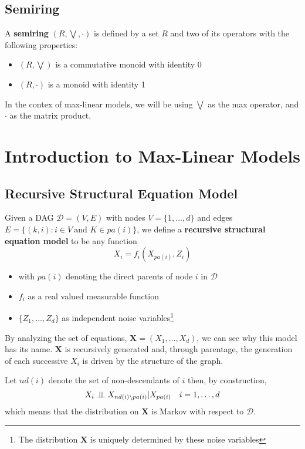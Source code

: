 \documentclass[12pt]{article}
\newcommand{\indep}{\perp \hspace{-.5 em} \perp}
\def\x{\mathbf{X}}
\newcommand{\ds}{\displaystyle}
\theoremstyle{definition}
\theoremstyle{definition}
\begin{document}
\subsection{Semiring}
A \textbf{semiring} $(R,\bigvee,\cdot)$ is defined by a set $R$ and two of its operators with the following properties:
\begin{itemize}
    \item $(R,\bigvee) $ is a commutative monoid with identity 0
    \item $(R,\cdot)$ is a monoid with identity 1
\end{itemize}
In the contex of max-linear models, we will be using $\bigvee$ as the max operator, and $\cdot$ as the matrix product.

\section{Introduction to Max-Linear Models}
\subsection{Recursive Structural Equation Model}
Given a DAG $\mathcal{D}=(V,E)$ with nodes $V=\{1,\hdots, d\}$ and edges $E=\{(k,i):i \in V \ \text{and } K \in pa(i)\}$, we define a \textbf{recursive structural equation model} to be any function $$X_i=f_i(X_{pa(i)},Z_i)$$

\begin{itemize}
    \item with $ \ds pa(i)$ denoting the direct parents of node $i$ in $\mathcal{D}$
    \item $f_i$ as a real valued measurable function
    \item $\ds \{ Z_1, \hdots , Z_d\}$ as independent noise variables\footnote{The distribution $\mathbf{X}$ is uniquely determined by these noise variables}
\end{itemize}
By analyzing the set of equations, $\mathbf{X}= (X_1, \hdots, X_d)$, we can see why this model has its name. $\x$ is recursively generated and, through parentage, the generation of each successive $X_i$ is driven by the structure of the graph.

\noindent Let $nd(i)$ denote the set of non-descendants of $i$ then, by construction, 
$$X_i \indep X_{nd(i)\setminus pa(i)}|X_{pa(i)} \ \ \ i=1,\hdots, d$$
 which means that the distribution on $\mathbf{X}$ is Markov with respect to $\mathcal{D}$.
 
\end{document}
